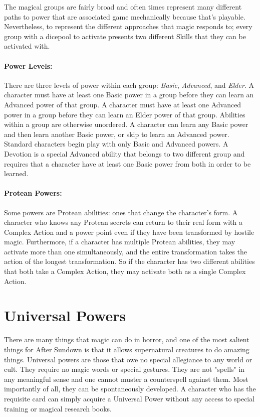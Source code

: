 The magical groups are fairly broad and often times represent many different paths to power that are associated game mechanically because that's playable. Nevertheless, to represent the different approaches that magic responds to; every group with a dicepool to activate presents two different Skills that they can be activated with.

\paragraph{Power Levels:} There are three levels of power within each group: \textit{Basic}, \textit{Advanced}, and \textit{Elder}. A character must have at least one Basic power in a group before they can learn an Advanced power of that group. A character must have at least one Advanced power in a group before they can learn an Elder power of that group. Abilities within a group are otherwise unordered. A character can learn any Basic power and then learn another Basic power, or skip to learn an Advanced power. Standard characters begin play with only Basic and Advanced powers. A Devotion is a special Advanced ability that belongs to two different group and requires that a character have at least one Basic power from both in order to be learned.

\paragraph{Protean Powers:} Some powers are Protean abilities: ones that change the character's form. A character who knows any Protean secrets can return to their real form with a Complex Action and a power point even if they have been transformed by hostile magic. Furthermore, if a character has multiple Protean abilities, they may activate more than one simultaneously, and the entire transformation takes the action of the longest transformation. So if the character has two different abilities that both take a Complex Action, they may activate both as a single Complex Action.

\section{Universal Powers}

There are many things that magic can do in horror, and one of the most salient things for After Sundown is that it allows supernatural creatures to do amazing things. Universal powers are those that owe no special allegiance to any world or cult. They require no magic words or special gestures. They are not "spells" in any meaningful sense and one cannot muster a counterspell against them. Most importantly of all, they can be spontaneously developed. A character who has the requisite card can simply acquire a Universal Power without any access to special training or magical research books.

